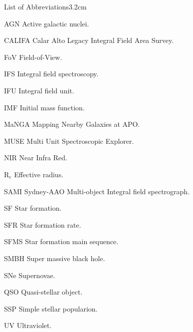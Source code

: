 \begin{mclistof}{List of Abbreviations}{3.2cm}

\item[AGN] Active galactic nuclei.

\item[CALIFA] Calar Alto Legacy Integral Field Area Survey.

\item[FoV] Field-of-View. 

\item[IFS] Integral field spectroscopy.

\item[IFU] Integral field unit.

\item[IMF] Initial mass function.

\item[MaNGA] Mapping Nearby Galaxies at APO.

\item[MUSE] Multi Unit Spectroscopic Explorer. 

\item[NIR] Near Infra Red.

\item[R$_e$] Effective radius.

\item[SAMI] Sydney-AAO Multi-object Integral field spectrograph.

\item[SF] Star formation.

\item[SFR] Star formation rate.

\item[SFMS] Star formation main sequence.

\item[SMBH] Super massive black hole.

\item[SNe] Supernovae.

\item[QSO] Quasi-stellar object.

\item[SSP] Simple stellar popularion.

\item[UV] Ultraviolet.





\end{mclistof} 
